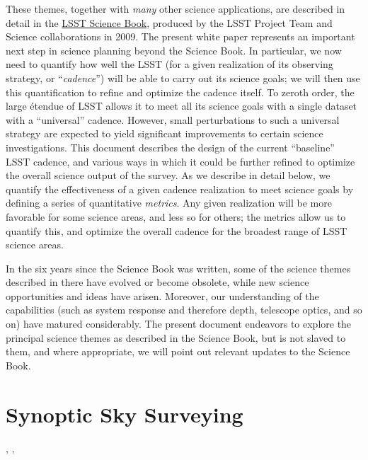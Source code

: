 These themes, together with {\em many} other science applications, are
described in detail in the
\href{http://lsst.org/scientists/scibook}{LSST Science Book}, produced
by the LSST Project Team and Science collaborations in 2009.  The
present white paper represents an important next step in science
planning beyond the Science Book.  In particular, we now need to
quantify how well the LSST (for a given realization of its observing
strategy, or ``{\em cadence}'') will be able to carry out its science
goals; we will then use this quantification to refine and optimize
the cadence itself.  To zeroth order, the large \'etendue of LSST
allows it to meet all its science goals with a single dataset with a
``universal'' cadence.  However, small perturbations to such a universal strategy are expected to yield significant improvements to certain science investigations. This document describes the design of the current ``baseline'' LSST
cadence, and various ways in which it could be further refined to
optimize the overall science output of the survey.  As we describe in detail
below, we quantify the effectiveness of a given cadence realization to
meet science goals by defining a series of quantitative {\em metrics}.
Any given realization will be more favorable for some science areas,
and less so for others; the metrics allow us to quantify this, and
optimize the overall cadence for the broadest range of LSST science
areas.

In the six years since the Science Book was written, some of the
science themes described in there have evolved or become obsolete,
while new science opportunities and ideas have arisen.  Moreover, our
understanding of the capabilities (such as system response and
therefore depth, telescope optics, and so on) have matured
considerably.  The present document endeavors to explore the principal
science themes as described in the Science Book, but is not slaved to
them, and where appropriate, we will point out relevant updates to the
Science Book.




\section{Synoptic Sky Surveying}
\def\secname{intro:baseline}\label{sec:\secname}

,
,


